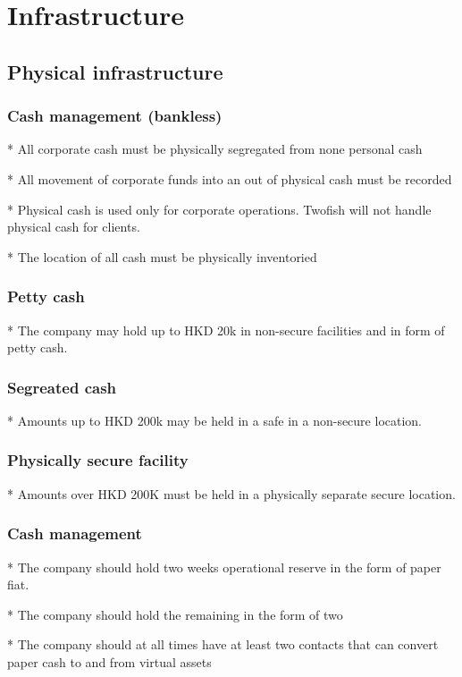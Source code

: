 \chapter{Infrastructure}

\section{Physical infrastructure}

\subsection{Cash management (bankless)}

* All corporate cash must be physically segregated from none personal
cash

* All movement of corporate funds into an out of physical cash must be
recorded

* Physical cash is used only for corporate operations.  Twofish will
not handle physical cash for clients.

* The location of all cash must be physically inventoried

\subsection{Petty cash}
* The company may hold up to HKD 20k in non-secure facilities and in
form of petty cash.

\subsection{Segreated cash}
* Amounts up to HKD 200k may be held in a safe in a non-secure
location.  

\subsection{Physically secure facility}
* Amounts over HKD 200K must be held in a physically separate secure
location.

\subsection{Cash management}
* The company should hold two weeks operational reserve in the form of
paper fiat.

* The company should hold the remaining in the form of two

* The company should at all times have at least two contacts that can
convert paper cash to and from virtual assets

